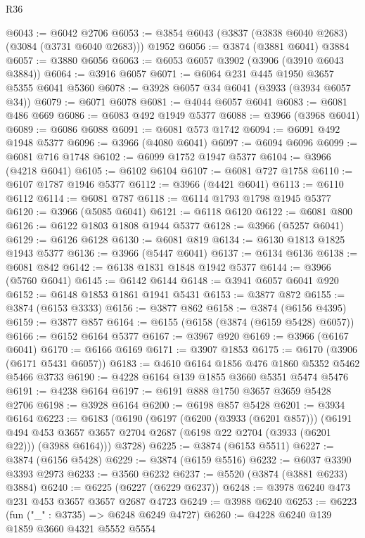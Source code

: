 \begin{lexlean}{R36}
\begin{coremodule}
@6043 := @6042 @2706
@6053 := @3854 @6043 (@3837 (@3838 @6040 @2683) (@3084 (@3731 @6040 @2683))) @1952
@6056 := @3874 (@3881 @6041) @3884
@6057 := @3880 @6056
@6063 := @6053 @6057 @3902 (@3906 (@3910 @6043 @3884))
@6064 := @3916 @6057
@6071 := @6064 @231 @445 @1950 @3657 @5355 @6041 @5360
@6078 := @3928 @6057 @34 @6041 (@3933 (@3934 @6057 @34))
@6079 := @6071 @6078
@6081 := @4044 @6057 @6041
@6083 := @6081 @486 @669
@6086 := @6083 @492 @1949 @5377
@6088 := @3966 (@3968 @6041)
@6089 := @6086 @6088
@6091 := @6081 @573 @1742
@6094 := @6091 @492 @1948 @5377
@6096 := @3966 (@4080 @6041)
@6097 := @6094 @6096
@6099 := @6081 @716 @1748
@6102 := @6099 @1752 @1947 @5377
@6104 := @3966 (@4218 @6041)
@6105 := @6102 @6104
@6107 := @6081 @727 @1758
@6110 := @6107 @1787 @1946 @5377
@6112 := @3966 (@4421 @6041)
@6113 := @6110 @6112
@6114 := @6081 @787
@6118 := @6114 @1793 @1798 @1945 @5377
@6120 := @3966 (@5085 @6041)
@6121 := @6118 @6120
@6122 := @6081 @800
@6126 := @6122 @1803 @1808 @1944 @5377
@6128 := @3966 (@5257 @6041)
@6129 := @6126 @6128
@6130 := @6081 @819
@6134 := @6130 @1813 @1825 @1943 @5377
@6136 := @3966 (@5447 @6041)
@6137 := @6134 @6136
@6138 := @6081 @842
@6142 := @6138 @1831 @1848 @1942 @5377
@6144 := @3966 (@5760 @6041)
@6145 := @6142 @6144
@6148 := @3941 @6057 @6041 @920
@6152 := @6148 @1853 @1861 @1941 @5431
@6153 := @3877 @872
@6155 := @3874 (@6153 @3333)
@6156 := @3877 @862
@6158 := @3874 (@6156 @4395)
@6159 := @3877 @857
@6164 := @6155 (@6158 (@3874 (@6159 @5428) @6057))
@6166 := @6152 @6164 @5377
@6167 := @3967 @920
@6169 := @3966 (@6167 @6041)
@6170 := @6166 @6169
@6171 := @3907 @1853
@6175 := @6170 (@3906 (@6171 @5431 @6057))
@6183 := @4610 @6164 @1856 @476 @1860 @5352 @5462 @5466 @3733
@6190 := @4228 @6164 @139 @1855 @3660 @5351 @5474 @5476
@6191 := @4238 @6164
@6197 := @6191 @888 @1750 @3657 @3659 @5428 @2706
@6198 := @3928 @6164
@6200 := @6198 @857 @5428
@6201 := @3934 @6164
@6223 := @6183
    (@6190
      (@6197
        (@6200 (@3933 (@6201 @857)))
        (@6191
          @494
          @453
          @3657
          @3657
          @2704
          @2687
          (@6198 @22 @2704 (@3933 (@6201 @22)))
          (@3988 @6164)))
      @3728)
@6225 := @3874 (@6153 @5511)
@6227 := @3874 (@6156 @5428)
@6229 := @3874 (@6159 @5516)
@6232 := @6037 @3390 @3393 @2973
@6233 := @3560 @6232
@6237 := @5520 (@3874 (@3881 @6233) @3884)
@6240 := @6225 (@6227 (@6229 @6237))
@6248 := @3978 @6240 @473 @231 @453 @3657 @3657 @2687 @4723
@6249 := @3988 @6240
@6253 := @6223 (fun ("_" : @3735) => @6248 @6249 @4727)
@6260 := @4228 @6240 @139 @1859 @3660 @4321 @5552 @5554

\end{coremodule}
\end{lexlean}
